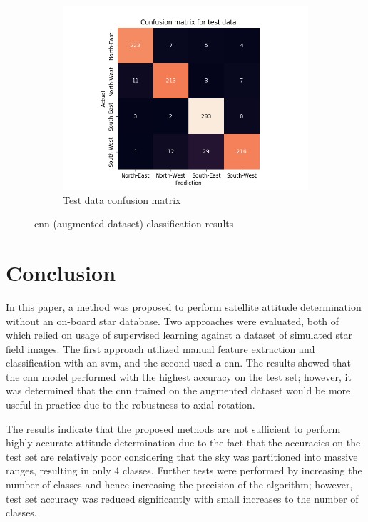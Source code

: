 \documentclass[10pt,twocolumn,letterpaper]{article}
\begin{document}
\begin{figure}
\begin{subfigure}{0.33\linewidth}
    \includegraphics[width=\linewidth, trim={7em, 0em, 9em, 5em}, clip]{cnn_aug_cfsn_test}
    \caption{Test data confusion matrix}
    \label{fig:cnn_test}
  \end{subfigure}
  \caption{\acrshort{cnn} (augmented dataset) classification results}
  \label{fig:cnn_aug_res}
\end{figure}


\section{Conclusion}
\label{sec:conclusion}

In this paper, a method was proposed to perform satellite attitude determination without an on-board star database. Two approaches were evaluated, both of which relied on usage of supervised learning against a dataset of simulated star field images. The first approach utilized manual feature extraction and classification with an \acrshort{svm}, and the second used a \acrshort{cnn}. The results showed that the \acrshort{cnn} model performed with the highest accuracy on the test set; however, it was determined that the \acrshort{cnn} trained on the augmented dataset would be more useful in practice due to the robustness to axial rotation.

The results indicate that the proposed methods are not sufficient to perform highly accurate attitude determination due to the fact that the accuracies on the test set are relatively poor considering that the sky was partitioned into massive ranges, resulting in only 4 classes. Further tests were performed by increasing the number of classes and hence increasing the precision of the algorithm; however, test set accuracy was reduced significantly with small increases to the number of classes.
\end{document}
